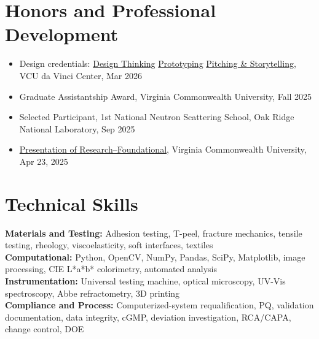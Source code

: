 \documentclass[10pt,letterpaper]{article}
\newcommand{\contactsep}{\hspace{0.45em}{\color{Rule}|}\hspace{0.45em}}
\newcommand{\cvlink}[2]{\href{#1}{#2}}
\begin{document}
\section{Honors and Professional Development}
\begin{itemize}
  \item Design credentials: \cvlink{https://www.credly.com/badges/e6785521-d537-4ea8-983f-3e1b123f01c7/public\_url}{Design Thinking} \contactsep \cvlink{https://www.credly.com/badges/ad98e65e-5b4e-4910-9dff-fa54960fdeca/public\_url}{Prototyping} \contactsep \cvlink{https://www.credly.com/badges/8caba56a-a526-4891-9408-55e68ee2b0cf/public\_url}{Pitching \& Storytelling}, VCU da Vinci Center, Mar 2026
  \item Graduate Assistantship Award, Virginia Commonwealth University, Fall 2025
  \item Selected Participant, 1st National Neutron Scattering School, Oak Ridge National Laboratory, Sep 2025
  \item \cvlink{https://www.credly.com/badges/a2c228cc-13df-4153-b22b-741275119646}{Presentation of Research--Foundational}, Virginia Commonwealth University, Apr 23, 2025
\end{itemize}


\section{Technical Skills}
{\small \textbf{Materials and Testing:} Adhesion testing, T-peel, fracture mechanics, tensile testing, rheology, viscoelasticity, soft interfaces, textiles\\[2pt]
\textbf{Computational:} Python, OpenCV, NumPy, Pandas, SciPy, Matplotlib, image processing, CIE L*a*b* colorimetry, automated analysis\\[2pt]
\textbf{Instrumentation:} Universal testing machine, optical microscopy, UV-Vis spectroscopy, Abbe refractometry, 3D printing\\[2pt]
\textbf{Compliance and Process:} Computerized-system requalification, PQ, validation documentation, data integrity, cGMP, deviation investigation, RCA/CAPA, change control, DOE}
\end{document}
